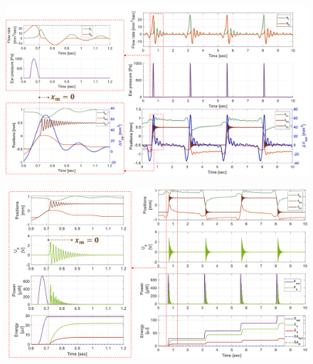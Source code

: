 \documentclass[3p,twocolumn,preprint]{elsarticle}
\begin{document}
\begin{figure}[!htbp]
	\centering
	\captionsetup{justification=centering}
	\includegraphics[trim={0cm 0cm 0cm 0.5cm},clip, width=\textwidth]{figures/positions+DeltaV_debits_pear.pdf}
	\caption{}
	\label{fig:positions+DeltaV_debits_pear}
\end{figure}
\begin{figure}[!htbp]
	\centering
	\captionsetup{justification=centering}
	\includegraphics[trim={0cm 0cm 0cm 0cm},clip, width=\textwidth]{figures/positions_Up_puissances_energies.pdf}
	\caption{}
	\label{fig:positions_Up_puissances_energies}
\end{figure}
\end{document}
